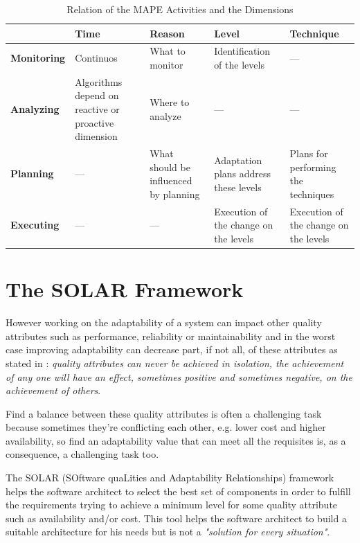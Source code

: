 \begin{table}[ht!b]
	\centering
	\begin{tabular}{|l||p{2.4cm}|p{2.4cm}|p{2.4cm}|p{2.4cm}|}
		\hline 
		& \textbf{Time} & \textbf{Reason} & \textbf{Level} & \textbf{Technique} \\ 
		\hline 
		\textbf{Monitoring} & Continuos & What to monitor & Identification of the levels & --- \\ 
		\hline 
		\textbf{Analyzing} & Algorithms depend on reactive or proactive dimension & Where to analyze & --- & --- \\ 
		\hline 
		\textbf{Planning} & --- & What should be influenced by planning & Adaptation plans address these levels & Plans for performing the techniques \\ 
		\hline 
		\textbf{Executing} & --- & --- & Execution of the change on the levels & Execution of the change on the levels \\ 
		\hline 
	
	\end{tabular} 
\caption[MAPE and Dimensions]{Relation of the MAPE Activities and the Dimensions}
\label{tab:mape}
\end{table}

\section{The SOLAR Framework}
However working on the adaptability of a system can impact other quality attributes such as performance, reliability or maintainability and in the worst case improving adaptability can decrease part, if not all, of these attributes as stated in \cite{bass2003software}: \emph{quality attributes can never be achieved in isolation, the achievement of any one will have an effect, sometimes positive and sometimes negative, on the achievement of others}.

Find a balance between these quality attributes is often a challenging task because sometimes they're conflicting each other, e.g. lower cost and higher availability, so find an adaptability value that can meet all the requisites is, as a consequence, a challenging task too.

The SOLAR (SOftware quaLities and Adaptability Relationships) framework \cite{solar} helps the software architect to select the best set of components in order to fulfill the requirements trying to achieve a minimum level for some quality attribute such as availability and/or cost. This tool helps the software architect to build a suitable architecture for his needs but is not a \emph{"solution for every situation"}.

